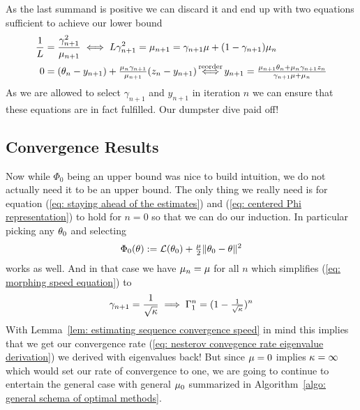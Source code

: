 As the last summand is positive we can discard it and end up with two equations
sufficient to achieve our lower bound
\begin{subequations}
\begin{align}
	\label{eq: morphing speed equation}
	\frac{1}{\ubound}
	&= \frac{\gamma_{n+1}^2}{\lbound_{n+1}}
	\iff \ubound \gamma_{n+1}^2 = \lbound_{n+1} = \gamma_{n+1} \lbound +  (1-\gamma_{n+1})\lbound_n
	\\
	0
	&= (\weights_n -y_{n+1}) + \tfrac{\lbound_n\gamma_{n+1}}{\lbound_{n+1}}(z_n - y_{n+1})
	\xiff{\text{reorder}}
	y_{n+1}
	= \tfrac{\lbound_{n+1}\weights_n + \lbound_n\gamma_{n+1} z_n}{\gamma_{n+1}\lbound + \lbound_n}
\end{align}
\end{subequations}
As we are allowed to select \(\gamma_{n+1}\) and \(y_{n+1}\) in iteration \(n\) we
can ensure that these equations are in fact fulfilled. Our dumpster dive paid off!

\subsection{Convergence Results}

Now while \(\Phi_0\) being an upper bound was nice to build intuition, we do
not actually need it to be an upper bound. The only thing we really need is
for equation (\ref{eq: staying ahead of the estimates}) and (\ref{eq: centered
Phi representation}) to hold for \(n=0\) so that we can do our induction. In
particular picking any \(\theta_0\) and selecting
\begin{align*}
	\Phi_0(\theta):= \mathcal{L}(\theta_0) + \tfrac{\mu}{2}\|\theta_0 - \theta\|^2
\end{align*}
works as well. And in that case we have \(\mu_n = \mu\) for all \(n\)
which simplifies (\ref{eq: morphing speed equation}) to
\begin{align*}
	\gamma_{n+1} = \frac1{\sqrt{\kappa}} \implies \Gamma_1^n = (1-\tfrac{1}{\sqrt{\kappa}})^n
\end{align*}
With Lemma~\ref{lem: estimating sequence convergence speed} in mind this implies
that we get our convergence rate (\ref{eq: nesterov convegence rate eigenvalue derivation})
we derived with eigenvalues back! But since \(\mu=0\) implies \(\kappa=\infty\)
which would set our rate of convergence to one, we are going to continue
to entertain the general case with general \(\mu_0\) summarized in
Algorithm~\ref{algo: general schema of optimal methods}.

